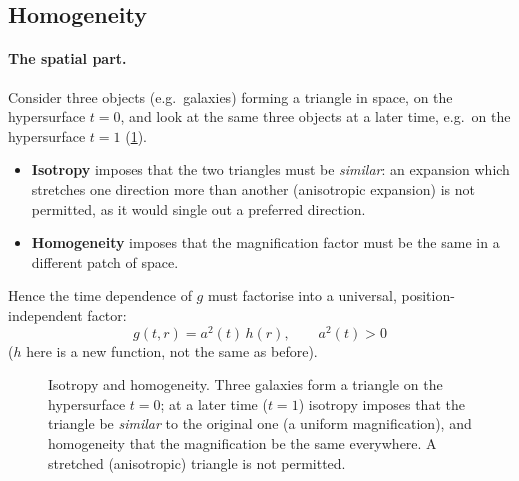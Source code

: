 \subsection{Homogeneity}
\paragraph{The spatial part.} Consider three objects (e.g.\ galaxies) forming a triangle in space, on the hypersurface $t=0$, and look at the same three objects at a later time, e.g.\ on the hypersurface $t=1$ (\cref{fig:triangles}).
\begin{itemize}
\item \textbf{Isotropy} imposes that the two triangles must be \emph{similar}: an expansion which stretches one direction more than another (anisotropic expansion) is not permitted, as it would single out a preferred direction.
\item \textbf{Homogeneity} imposes that the magnification factor must be the same in a different patch of space.
\end{itemize}
Hence the time dependence of $g$ must factorise into a universal, position-independent factor:
\begin{equation}
  g(t,r)=a^2(t)\,h(r),\qquad a^2(t)>0
\end{equation}
($h$ here is a new function, not the same as before).

\begin{figure}[ht]
\centering
{}
\caption{Isotropy and homogeneity. Three galaxies form a triangle on the hypersurface $t=0$; at a later time ($t=1$) isotropy imposes that the triangle be \emph{similar} to the original one (a uniform magnification), and homogeneity that the magnification be the same everywhere. A stretched (anisotropic) triangle is not permitted.}
\label{fig:triangles}
\end{figure}

